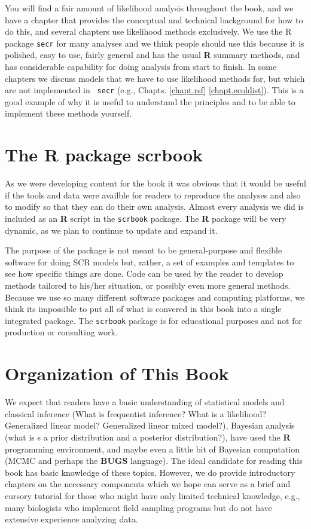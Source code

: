 \begin{itemize}
You will find a fair amount of likelihood analysis throughout the book,
 and we have a chapter that
provides the conceptual and technical background for how to do this,
and several chapters use likelihood methods exclusively. We use the R
package \mbox{\tt secr} \citep{efford_etal:2009euring} for many
analyses and we think people should use this because it is polished,
easy to use, fairly general and has the usual {\bf R} summary methods,
and has considerable capability for doing analysis from start to
finish. In some chapters we discuss models that we have to use
likelihood methods for, but which are not implemented in \mbox{\tt
  secr} (e.g., Chapts. \ref{chapt.rsf} \ref{chapt.ecoldist}). This is
a good example of why it is useful to understand the principles and to
be able to implement these methods yourself.

\section*{The R package scrbook}

As we were developing content for the book it was obvious that it
would be useful if the tools and data were availble for
readers to reproduce the analyses and also to modify so that they can
do their own analysis.  Almost every analysis we did is included as an
{\bf R} script in the \mbox{\tt scrbook} package.
The {\bf R} package will be very dynamic, as we plan to
continue to update and expand it.

The purpose of the package is not meant to be general-purpose and
flexible software for doing SCR models but, rather, a set of examples
and templates to see how specific things are done. Code can be used
by the reader to develop methods tailored to his/her situation, or
possibly even more general methods.  Because we use so many different
software packages and computing platforms, we think its impossible to
put all of what is convered in this book into a single integrated
package.  The \mbox{\tt scrbook} package is for educational purposes
and not for production or consulting work.


\section*{Organization of This Book}

We expect that readers have a basic understanding of statistical models
and classical inference (What is frequentist inference? What is a
likelihood? Generalized linear model? Generalized linear mixed
model?), Bayesian analysis (what is s a prior distribution and a
posterior distribution?), have used the {\bf R} programming
environment, and maybe even a little bit of Bayesian computation (MCMC
and perhaps the \textbf{BUGS} language).  The ideal candidate for reading this
book has basic knowledge of these topics. However, we do provide
introductory chapters on the necessary components which we hope can
serve as a brief and cursory tutorial for those who might have only
limited technical knowledge, e.g., many biologists who implement field
sampling programs but do not have extensive experience analyzing data.


\end{itemize}
